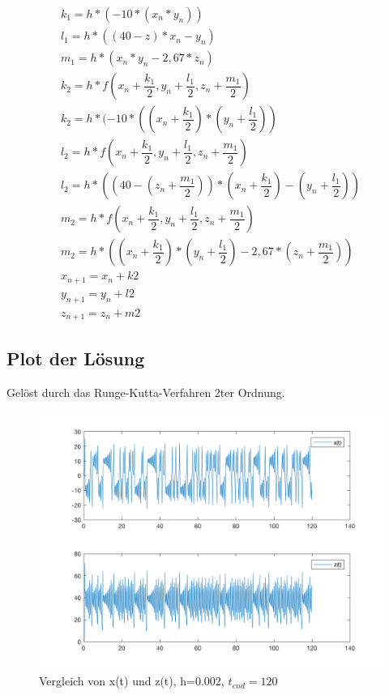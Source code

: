 \documentclass[]{scrartcl}
\begin{document}
\begin{align}
k_{1} = h * (-10 * (x_{n} * y_{n})) \\
l_{1} = h * ((40 - z) * x_{n} - y_{n}) \\
m_{1} = h * (x_{n} * y_{n} - 2,67 * z_{n}) \\
k_{2} = h*f(x_{n} + \dfrac{k_{1} }{2},y_{n} + \dfrac{l_{1} }{2},z_{n} + \dfrac{m_{1} }{2}) \\
k_{2} = h* (-10 * ((x_{n} + \dfrac{k_{1} }{2})*(y_{n} + \dfrac{l_{1} }{2})) \\
l_{2} = h*f(x_{n} + \dfrac{k_{1} }{2},y_{n} + \dfrac{l_{1} }{2},z_{n} + \dfrac{m_{1} }{2}) \\
l_{2} = h*((40 - (z_{n} + \dfrac{m_{1} }{2})) * (x_{n} + \dfrac{k_{1} }{2}) - (y_{n} + \dfrac{l_{1} }{2})) \\
m_{2} = h*f(x_{n} + \dfrac{k_{1} }{2},y_{n} + \dfrac{l_{1} }{2},z_{n} + \dfrac{m_{1} }{2}) \\
m_{2} = h*((x_{n} + \dfrac{k_{1} }{2}) * (y_{n} + \dfrac{l_{1} }{2}) - 2,67 * (z_{n} + \dfrac{m_{1} }{2})) \\
x_{n+1} = x_{n} + k2 \\
y_{n+1} = y_{n} + l2 \\
z_{n+1} = z_{n} + m2
\end{align}

\subsection{Plot der Lösung}
Gelöst durch das Runge-Kutta-Verfahren 2ter Ordnung.
\begin{figure}[H]
	\centering
	\includegraphics[width=1\linewidth]{a1_3_1}
	\caption{Vergleich von x(t) und z(t), h=0.002, $t_{end} = 120$}
	\label{fig:a1_3_1}
\end{figure}
\end{document}
